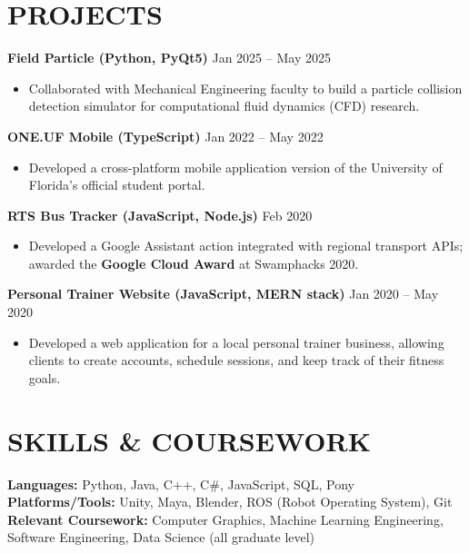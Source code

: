 \documentclass[10pt, letterpaper]{article}
\begin{document}
\section{PROJECTS}
\noindent \textbf{Field Particle (Python, PyQt5)} \hfill Jan 2025 -- May 2025
\begin{itemize}
    \item Collaborated with Mechanical Engineering faculty to build a particle collision detection simulator for computational fluid dynamics (CFD) research.
\end{itemize}

\noindent \textbf{ONE.UF Mobile (TypeScript)} \hfill Jan 2022 -- May 2022
\begin{itemize}
    \item Developed a cross-platform mobile application version of the University of Florida's official student portal.
\end{itemize}


\noindent \textbf{RTS Bus Tracker (JavaScript, Node.js)} \hfill Feb 2020
\begin{itemize}
    \item Developed a Google Assistant action integrated with regional transport APIs; awarded the \textbf{Google Cloud Award} at Swamphacks 2020.
\end{itemize}

\noindent \textbf{Personal Trainer Website (JavaScript, MERN stack)} \hfill Jan 2020 -- May 2020
\begin{itemize}
    \item Developed a web application for a local personal trainer business, allowing clients to create accounts, schedule sessions, and keep track of their fitness goals.
\end{itemize}

\section{SKILLS \& COURSEWORK}
\noindent \textbf{Languages:} Python, Java, C++, C\#, JavaScript, SQL, Pony \\
\noindent \textbf{Platforms/Tools:} Unity, Maya, Blender, ROS (Robot Operating System), Git \\
\noindent \textbf{Relevant Coursework:} Computer Graphics, Machine Learning Engineering, Software Engineering, Data Science (all graduate level)
\end{document}

